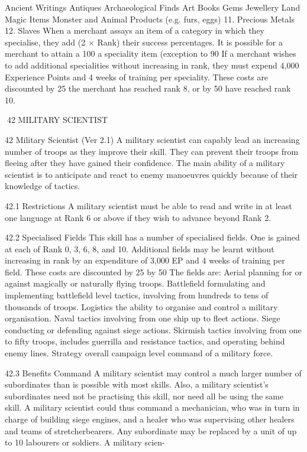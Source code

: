 \documentclass[a4paper]{article}
\begin{document}
\begin{multicols}{3}
Ancient Writings
Antiques
Archaeological Finds
Art
Books
Gems
Jewellery
Land
Magic Items
Monster and Animal Products (e.g. furs,
eggs)
11. Precious Metals
12. Slaves
When a merchant assays an item of a category in
which they specialise, they add (2 × Rank)%
their success percentages. It is possible for a merchant to attain a 100%
a speciality item (exception to 90%
If a merchant wishes to add additional specialities
without increasing in rank, they must expend 4,000
Experience Points and 4 weeks of training per
speciality. These costs are discounted by 25%
the merchant has reached rank 8, or by 50%
have reached rank 10.

42 MILITARY SCIENTIST

42 Military Scientist (Ver 2.1)
A military scientist can capably lead an increasing
number of troops as they improve their skill. They
can prevent their troops from fleeing after they
have gained their confidence. The main ability of a
military scientist is to anticipate and react to enemy
manoeuvres quickly because of their knowledge of
tactics.

42.1 Restrictions
A military scientist must be able to read and write
in at least one language at Rank 6 or above if they
wish to advance beyond Rank 2.

42.2 Specialised Fields
This skill has a number of specialised fields. One is
gained at each of Rank 0, 3, 6, 8, and 10.
Additional fields may be learnt without increasing
in rank by an expenditure of 3,000 EP and 4 weeks
of training per field. These costs are discounted by
25%
by 50%
The fields are:
Aerial planning for or against magically or naturally flying troops.
Battlefield formulating and implementing battlefield level tactics, involving from hundreds to tens
of thousands of troops.
Logistics the ability to organise and control a
military organisation.
Naval tactics involving from one ship up to fleet
actions. Siege conducting or defending against
siege actions.
Skirmish tactics involving from one to fifty troops,
includes guerrilla and resistance tactics, and operating behind enemy lines.
Strategy overall campaign level command of a
military force.

42.3 Benefits
Command
A military scientist may control a much larger
number of subordinates than is possible with most
skills. Also, a military scientist’s subordinates need
not be practising this skill, nor need all be using the
same skill. A military scientist could thus command a mechanician, who was in turn in charge of
building siege engines, and a healer who was supervising other healers and teams of stretcherbearers. Any subordinate may be replaced by a unit
of up to 10 labourers or soldiers. A military scien-


\end{multicols}
\end{document}
